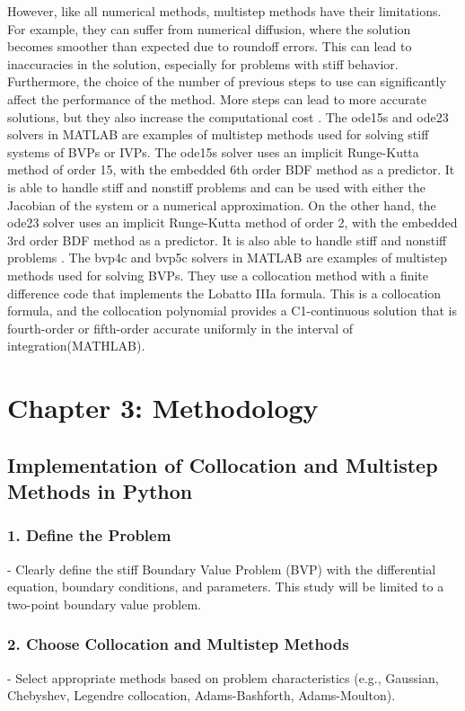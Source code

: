\documentclass{report}
\begin{document}
However, like all numerical methods, multistep methods have their limitations. For example, they can suffer from numerical diffusion, where the solution becomes smoother than expected due to roundoff errors. This can lead to inaccuracies in the solution, especially for problems with stiff behavior. Furthermore, the choice of the number of previous steps to use can significantly affect the performance of the method. More steps can lead to more accurate solutions, but they also increase the computational cost \cite{math7121158}.
The ode15s and ode23 solvers in MATLAB are examples of multistep methods used for solving stiff systems of BVPs or IVPs. The ode15s solver uses an implicit Runge-Kutta method of order 15, with the embedded 6th order BDF method as a predictor. It is able to handle stiff and nonstiff problems and can be used with either the Jacobian of the system or a numerical approximation. On the other hand, the ode23 solver uses an implicit Runge-Kutta method of order 2, with the embedded 3rd order BDF method as a predictor. It is also able to handle stiff and nonstiff problems \cite{wong2020lecture}.
The bvp4c and bvp5c solvers in MATLAB are examples of multistep methods used for solving BVPs. They use a collocation method with a finite difference code that implements the Lobatto IIIa formula. This is a collocation formula, and the collocation polynomial provides a C1-continuous solution that is fourth-order or fifth-order accurate uniformly in the interval of integration(MATHLAB).



\section{Chapter 3: Methodology}

\subsection{Implementation of Collocation and Multistep Methods in Python}

\subsubsection{1. Define the Problem}
   - Clearly define the stiff Boundary Value Problem (BVP) with the differential equation, boundary conditions, and parameters. This study will be limited to a two-point boundary value problem.

\subsubsection{2. Choose Collocation and Multistep Methods}
   - Select appropriate methods based on problem characteristics (e.g., Gaussian, Chebyshev, Legendre collocation, Adams-Bashforth, Adams-Moulton).
\end{document}
